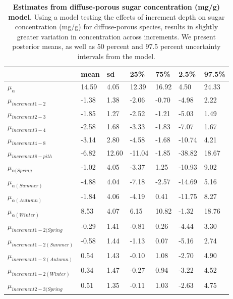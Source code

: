 \documentclass{article}\usepackage[]{graphicx}\usepackage[]{color}
\begin{document}
\begin{table}[ht]
\centering
\caption{\textbf{Estimates from diffuse-porous sugar concentration (mg/g) model}. Using a model testing the effects of increment depth on sugar concentration (mg/g) for diffuse-porous species, results in slightly greater variation in concentration across increments. We present posterior means, as well as 50 percent and 97.5 percent uncertainty intervals from the model.} 
\label{tab:diffsug}
\begingroup\footnotesize
\begin{tabular}{|p{}|p{}|p{}|p{}|p{}|p{}|p{}|}
  \hline
 & mean & sd & 25\% & 75\% & 2.5\% & 97.5\% \\ 
  \hline
$\mu_{\alpha}$ & 14.59 & 4.05 & 12.39 & 16.92 & 4.50 & 24.33 \\ 
  $\mu_{increment 1-2}$ & -1.38 & 1.38 & -2.06 & -0.70 & -4.98 & 2.22 \\ 
  $\mu_{increment 2-3}$ & -1.85 & 1.27 & -2.52 & -1.21 & -5.03 & 1.49 \\ 
  $\mu_{increment 3-4}$ & -2.58 & 1.68 & -3.33 & -1.83 & -7.07 & 1.67 \\ 
  $\mu_{increment 4-8}$ & -3.14 & 2.80 & -4.58 & -1.68 & -10.74 & 4.21 \\ 
  $\mu_{increment 8-pith}$ & -6.82 & 12.60 & -11.04 & -1.85 & -38.82 & 18.67 \\ 
  $\mu_{\alpha (Spring}$ & -1.02 & 4.05 & -3.37 & 1.25 & -10.93 & 9.02 \\ 
  $\mu_{\alpha (Summer)}$ & -4.88 & 4.04 & -7.18 & -2.57 & -14.69 & 5.16 \\ 
  $\mu_{\alpha (Autumn)}$ & -1.84 & 4.06 & -4.19 & 0.41 & -11.75 & 8.27 \\ 
  $\mu_{\alpha (Winter)}$ & 8.53 & 4.07 & 6.15 & 10.82 & -1.32 & 18.76 \\ 
  $\mu_{increment 1-2 (Spring}$ & -0.29 & 1.41 & -0.81 & 0.26 & -4.44 & 3.30 \\ 
  $\mu_{increment 1-2 (Summer)}$ & -0.58 & 1.44 & -1.13 & 0.07 & -5.16 & 2.74 \\ 
  $\mu_{increment 1-2 (Autumn)}$ & 0.54 & 1.43 & -0.10 & 1.08 & -2.70 & 4.90 \\ 
  $\mu_{increment 1-2 (Winter)}$ & 0.34 & 1.47 & -0.27 & 0.94 & -3.22 & 4.52 \\ 
  $\mu_{increment 2-3 (Spring}$ & 0.51 & 1.35 & -0.11 & 1.03 & -2.63 & 4.75 \\ 

\end{tabular}
\end{table}
\end{document}
